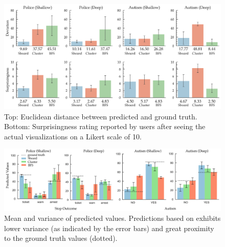 \begin{figure}[bht]
\centering
\includegraphics[width=\linewidth]{figures/Devation_Surprisingness.pdf}
\caption{Top: Euclidean distance between predicted and ground truth. Bottom: Surprisingness rating reported by users after seeing the actual visualizations on a Likert scale of 10.}
\label{fig:distance}
\end{figure}
\begin{figure}[bht]
\centering
\includegraphics[width=\linewidth]{figures/Prediction_Actual.png}
\caption{Mean and variance of predicted values. Predictions based on \system exhibits lower variance (as indicated by the error bars) and great proximity to the ground truth values (dotted).}
\label{fig:actual_predictions}
\end{figure}
